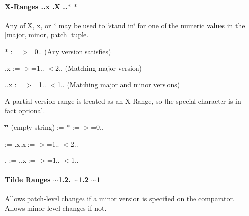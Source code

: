 \paragraph*{X-\/\+Ranges {..\+x} {.\+X} {..$\ast$} {\ttfamily $\ast$}}

Any of {\ttfamily X}, {\ttfamily x}, or {\ttfamily $\ast$} may be used to \char`\"{}stand in\char`\"{} for one of the numeric values in the {\ttfamily \mbox{[}major, minor, patch\mbox{]}} tuple.


\begin{DoxyItemize}
\item {\ttfamily $\ast$} \+:= {\ttfamily $>$=0..} (Any version satisfies)
\item {.\+x} \+:= {\ttfamily $>$=1.. $<$2..} (Matching major version)
\item {..\+x} \+:= {\ttfamily $>$=1.. $<$1..} (Matching major and minor versions)
\end{DoxyItemize}

A partial version range is treated as an X-\/\+Range, so the special character is in fact optional.


\begin{DoxyItemize}
\item {\ttfamily \char`\"{}\char`\"{}} (empty string) \+:= {\ttfamily $\ast$} \+:= {\ttfamily $>$=0..}
\item {} \+:= {.\+x.\+x} \+:= {\ttfamily $>$=1.. $<$2..}
\item {.} \+:= {..\+x} \+:= {\ttfamily $>$=1.. $<$1..}
\end{DoxyItemize}

\paragraph*{Tilde Ranges {\ttfamily $\sim$1.2.} {\ttfamily $\sim$1.2} {\ttfamily $\sim$1}}

Allows patch-\/level changes if a minor version is specified on the comparator. Allows minor-\/level changes if not.


